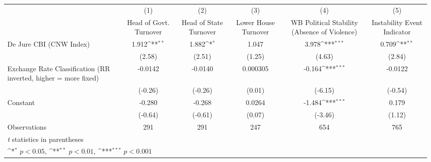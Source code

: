 {
\def\sym#1{\ifmmode^{#1}\else\(^{#1}\)\fi}
\begin{tabular*}{\linewidth}{@{\hskip\tabcolsep\extracolsep\fill}l*{5}{c}}
\toprule
                &\multicolumn{1}{c}{(1)}&\multicolumn{1}{c}{(2)}&\multicolumn{1}{c}{(3)}&\multicolumn{1}{c}{(4)}&\multicolumn{1}{c}{(5)}\\
                &\multicolumn{1}{c}{Head of Govt. Turnover}&\multicolumn{1}{c}{Head of State Turnover}&\multicolumn{1}{c}{Lower House Turnover}&\multicolumn{1}{c}{WB Political Stability (Absence of Violence)}&\multicolumn{1}{c}{Instability Event Indicator}\\
\midrule
De Jure CBI (CNW Index)&    1.912\sym{**} &    1.882\sym{*}  &    1.047         &    3.978\sym{***}&    0.709\sym{**} \\
                &   (2.58)         &   (2.51)         &   (1.25)         &   (4.63)         &   (2.84)         \\
\addlinespace
Exchange Rate Classification (RR inverted, higher = more fixed)&  -0.0142         &  -0.0140         & 0.000305         &   -0.164\sym{***}&  -0.0122         \\
                &  (-0.26)         &  (-0.26)         &   (0.01)         &  (-6.15)         &  (-0.54)         \\
\addlinespace
Constant        &   -0.280         &   -0.268         &   0.0264         &   -1.484\sym{***}&    0.179         \\
                &  (-0.64)         &  (-0.61)         &   (0.07)         &  (-3.46)         &   (1.12)         \\
\midrule
Observations    &      291         &      291         &      247         &      654         &      765         \\
\bottomrule
\multicolumn{6}{l}{\footnotesize \textit{t} statistics in parentheses}\\
\multicolumn{6}{l}{\footnotesize \sym{*} \(p<0.05\), \sym{**} \(p<0.01\), \sym{***} \(p<0.001\)}\\
\end{tabular*}
}
